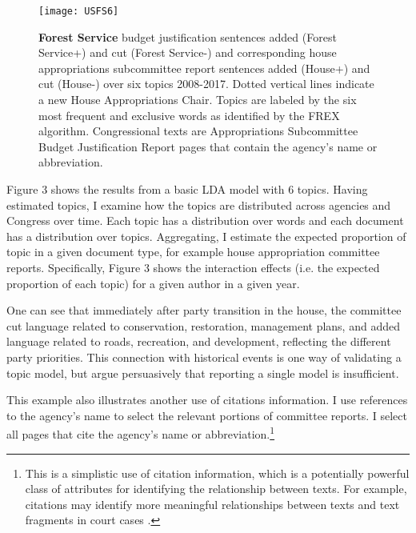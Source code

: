 \documentclass{article}
\begin{document}
\begin{figure}[!h]
\label{USFS6}
\caption{\textbf{Forest Service} budget justification sentences added (Forest Service+) and cut (Forest Service-) and corresponding house appropriations subcommittee report sentences added (House+) and cut (House-) over six topics 2008-2017. Dotted vertical lines indicate a new House Appropriations Chair. %
Topics are labeled by the six most frequent and exclusive words as identified by the FREX algorithm.
Congressional texts are Appropriations Subcommittee Budget Justification Report pages that contain the agency's name or abbreviation.}
\texttt{[image: USFS6]}
\end{figure}
Figure 3 shows the results from a basic LDA model with 6 topics. Having estimated topics, I examine how the topics are distributed across agencies and Congress over time. Each topic has a distribution over words and each document has a distribution over topics. Aggregating, I estimate the expected proportion of topic in a given document type, for example house appropriation committee reports. Specifically, Figure 3 shows the interaction effects (i.e. the expected proportion of each topic) for a given author in a given year. 

One can see that immediately after party transition in the house, the committee cut language related to conservation, restoration, management plans, and added language related to roads, recreation, and development, reflecting the different party priorities. This connection with historical events is one way of validating a topic model, but \citet{Wilkerson2016} argue persuasively that reporting a single model is insufficient. 


This example also illustrates another use of citations information. I use references to the agency's name to select the relevant portions of committee reports. I select all pages that cite the agency's name or abbreviation.\footnote{This is a simplistic use of citation information, which is a potentially powerful class of attributes for identifying the relationship between texts. For example, citations may identify more meaningful relationships between texts and text fragments in court cases \citep{Cross2010}.}
\end{document}
